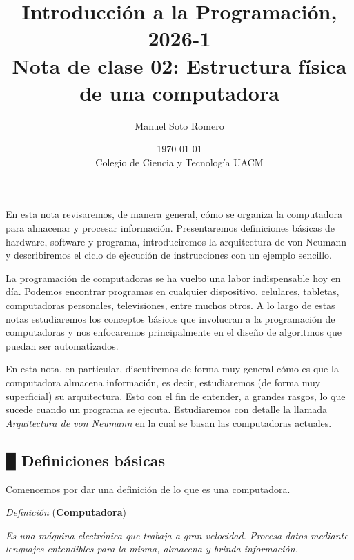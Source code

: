 \documentclass[11pt,spanish]{article}
\begin{document}

\title{Introducción a la Programación, 2026-1\\
Nota de clase 02: Estructura física de una computadora}
\author{Manuel Soto Romero}
\date{\today \\ Colegio de Ciencia y Tecnología UACM}

\maketitle
\setcounter{section}{2}

En esta nota revisaremos, de manera general, cómo se organiza la computadora
para almacenar y procesar información. Presentaremos definiciones básicas
de hardware, software y programa, introduciremos la arquitectura de von
Neumann y describiremos el ciclo de ejecución de instrucciones con un
ejemplo sencillo.

La programación de computadoras se ha vuelto una labor indispensable
hoy en día. Podemos encontrar programas en cualquier dispositivo,
celulares, tabletas, computadoras personales, televisiones, entre
muchos otros. A lo largo de estas notas estudiaremos los conceptos
básicos que involucran a la programación de computadoras y nos enfocaremos
principalmente en el diseño de algoritmos que puedan ser automatizados.

En esta nota, en particular, discutiremos de forma muy general cómo
es que la computadora almacena información, es decir, estudiaremos
(de forma muy superficial) su arquitectura. Esto con el fin de entender,
a grandes rasgos, lo que sucede cuando un programa se ejecuta. Estudiaremos
con detalle la llamada \emph{Arquitectura de von Neumann} en la cual
se basan las computadoras actuales.

\subsection*{\color{celestialblue}█ \quad{}\color{black}Definiciones básicas}

Comencemos por dar una definición de lo que es una computadora.

\begin{bclogo}[noborder=true, couleurBarre=celestialblue,arrondi =0.1, couleur =anti-flashwhite, logo=\bcplume, marge =10]{\textit{Definición} (\textbf{Computadora})}
\vspace{0.25cm}

\emph{Es una máquina electrónica que trabaja a gran velocidad. Procesa
datos mediante lenguajes entendibles para la misma, almacena y brinda
información.}

\vspace{0.25cm}       
\end{bclogo}
\end{document}
